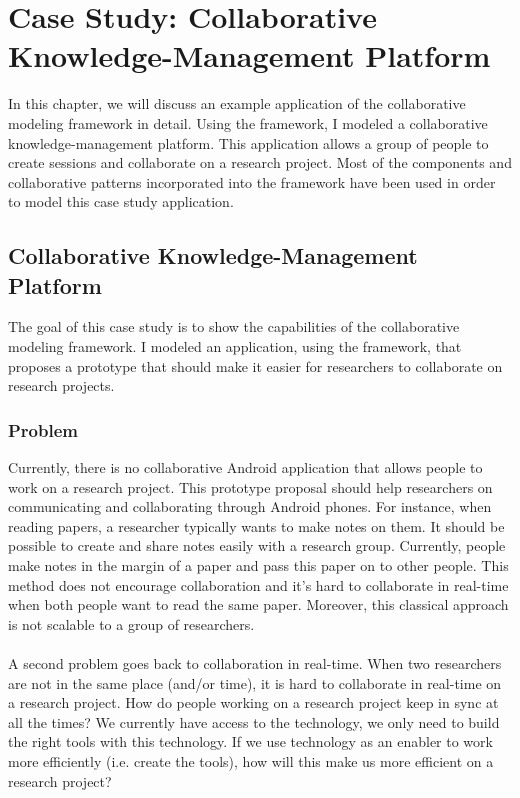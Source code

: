 \chapter{Case Study: Collaborative Knowledge-Management Platform}

In this chapter, we will discuss an example application of the collaborative modeling framework in detail. Using the framework, I modeled a collaborative knowledge-management platform. This application allows a group of people to create sessions and collaborate on a research project. Most of the components and collaborative patterns incorporated into the framework have been used in order to model this case study application. 

\section{Collaborative Knowledge-Management Platform}

The goal of this case study is to show the capabilities of the collaborative modeling framework. I modeled an application, using the framework, that proposes a prototype that should make it easier for researchers to collaborate on research projects.

\subsection{Problem}

Currently, there is no collaborative Android application that allows people to work on a research project. This prototype proposal should help researchers on communicating and collaborating through Android phones. For instance, when reading papers, a researcher typically wants to make notes on them. It should be possible to create and share notes easily with a research group. Currently, people make notes in the margin of a paper and pass this paper on to other people. This method does not encourage collaboration and it's hard to collaborate in real-time when both people want to read the same paper. Moreover, this classical approach is not scalable to a group of researchers. \\ \\
A second problem goes back to collaboration in real-time. When two researchers are not in the same place (and/or time), it is hard to collaborate in real-time on a research project. How do people working on a research project keep in sync at all the times? We currently have access to the technology, we only need to build the right tools with this technology. If we use technology as an enabler to work more efficiently (i.e. create the tools), how will this make us more efficient on a research project?

